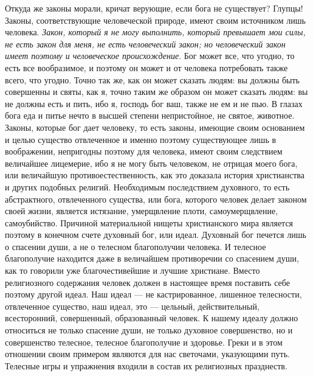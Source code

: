 \documentclass[12pt]{article}
\begin{document}
Откуда же законы морали, кричат верующие, если бога не существует? Глупцы! Законы, соответствующие человеческой природе, имеют своим источником лишь человека. \emph{Закон, который я не могу выполнить, который превышает мои силы, не есть закон для меня, не есть человеческий закон; но человеческий закон имеет поэтому и человеческое происхождение}. Бог может все, что угодно, то есть все вообразимое, и поэтому он может и от человека потребовать также всего, что угодно. Точно так же, как он может сказать людям: вы должны быть совершенны и святы, как я, точно таким же образом он может сказать людям: вы не должны есть и пить, ибо я, господь бог ваш, также не ем и не пью. В глазах бога еда и питье нечто в высшей степени непристойное, не святое, животное. Законы, которые бог дает человеку, то есть законы, имеющие своим основанием и целью существо отвлеченное и именно поэтому существующее лишь в воображении, непригодны поэтому для человека, имеют своим следствием величайшее лицемерие, ибо я не могу быть человеком, не отрицая моего бога, или величайшую противоестественность, как это доказала история христианства и других подобных религий. Необходимым последствием духовного, то есть абстрактного, отвлеченного существа, или бога, которого человек делает законом своей жизни, является истязание, умерщвление плоти, самоумерщвление, самоубийство. Причиной материальной нищеты христианского мира является поэтому в конечном счете духовный бог, или идеал. Духовный бог печется лишь о спасении души, а не о телесном благополучии человека. И телесное благополучие находится даже в величайшем противоречии со спасением души, как то говорили уже благочестивейшие и лучшие христиане. Вместо религиозного содержания человек должен в настоящее время поставить себе поэтому другой идеал. Наш идеал --- не кастрированное, лишенное телесности, отвлеченное существо, наш идеал, это --- цельный, действительный, всесторонний, совершенный, образованный человек. К нашему идеалу должно относиться не только спасение души, не только духовное совершенство, но и совершенство телесное, телесное благополучие и здоровье. Греки и в этом отношении своим примером являются для нас светочами, указующими путь. Телесные игры и упражнения входили в состав их религиозных празднеств. 
\end{document}
